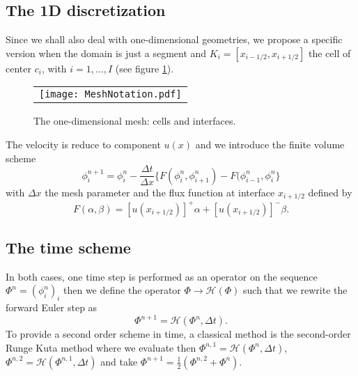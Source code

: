\subsection{The 1D discretization}
Since we shall also deal with one-dimensional geometries, we propose a specific version when the domain
is just a segment and $K_i=[x_{i-1/2},x_{i+1/2}]$ the cell of center $c_i$, with $i=1,...,I$ (see figure 
\ref{mesh1D}).
\begin{figure}[ht]
\begin{center}
\begin{tabular}{c}
\texttt{[image: MeshNotation.pdf]}
\end{tabular}
\end{center}
\caption{\label{mesh1D} \footnotesize The one-dimensional mesh: cells and interfaces.} 
\end{figure}
The velocity is reduce to component $u(x)$ and we introduce the finite volume scheme
$$
\phi_i^{n+1}=\phi_i^{n}-\frac{\Delta t}{\Delta x}\Big \{
F(\phi^n_{i},\phi^n_{i+1})-F(\phi^n_{i-1},\phi^n_{i} \Big \}
$$
with $\Delta x$ the mesh parameter and the flux function at interface $x_{i+1/2}$ defined by
$$
F(\alpha,\beta)=[u(x_{i+1/2})]^+\alpha+[u(x_{i+1/2})]^-\beta.
$$
\subsection{The time scheme}
In both cases, one time step is performed as an operator on the sequence $\Phi^n=(\phi^n_i)_i$
then we define the operator $\Phi \to \mathcal H(\Phi)$ such that we rewrite the forward Euler step as
$$
\Phi^{n+1}=\mathcal H(\Phi^n,\Delta t).
$$
To provide a second order scheme in time, a classical method is the second-order Runge Kuta method
where we evaluate then $\Phi^{n,1}=\mathcal H(\Phi^n,\Delta t)$, 
$\Phi^{n,2}=\mathcal H(\Phi^{n,1},\Delta t)$ and take $\Phi^{n+1}=\frac{1}{2}(\Phi^{n,2}+\Phi^n)$.
